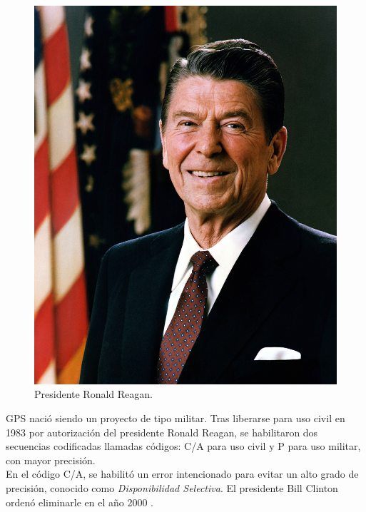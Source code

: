 \begin{figure}[H]
\centering
\includegraphics[scale=0.50]{Figures/RonaldReagan}
\caption[Presidente Ronald Reagan.]{Presidente Ronald Reagan\footnotemark.}
\label{fig:ErrDis}
\end{figure}


GPS nació siendo un proyecto de tipo militar. Tras liberarse para uso civil en 1983 por autorización del presidente Ronald Reagan, se habilitaron dos secuencias codificadas llamadas códigos: C/A para uso civil y P para uso militar, con mayor precisión. \\

En el código C/A, se habilitó un error intencionado para evitar un alto grado de precisión, conocido como \textit{Disponibilidad Selectiva}. El presidente Bill Clinton ordenó eliminarle en el año 2000 \citep{termal2014prototipo}.

